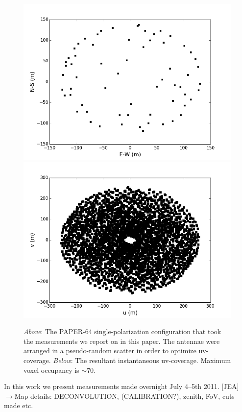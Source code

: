 \documentclass[preprint2,epsf,epsfig,graphics]{emulateapj}
\begin{document}
\begin{figure}
\includegraphics[width=\columnwidth]{psa64imageconfig.png}
\includegraphics[width=\columnwidth]{psa64uvcoverage.png}
\caption{\textit{Above}: The PAPER-64 single-polarization configuration that took the measurements we report on in this paper. The antennae were arranged in a pseudo-random scatter in order to optimize uv-coverage. \textit{Below}: The resultant instantaneous uv-coverage. Maximum voxel occupancy is $\sim70$.}
\label{fig:config}
\end{figure}

In this work we present measurements made overnight July 4--5th 2011.
{\color{blue}[JEA] $\rightarrow$}Map details: DECONVOLUTION, (CALIBRATION?), zenith, FoV, cuts made etc.
\end{document}
